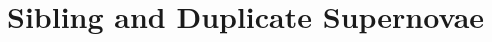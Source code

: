 \documentclass[twocolumn]{aastex63}
\begin{document}
   










\section{Sibling and Duplicate Supernovae }
\end{document}
